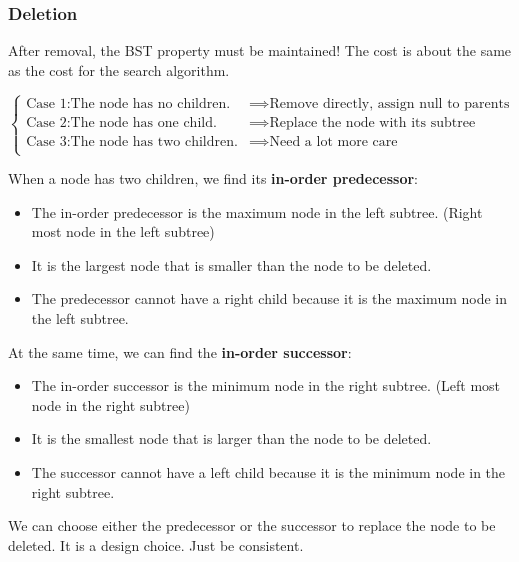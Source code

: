 \documentclass[letterpaper,12pt]{article}
\begin{document}
\subsubsection{Deletion}
After removal, the BST property must be maintained! The cost is about the same as the cost for the search algorithm.

$\begin{cases}
    \text{Case 1:}  \text{The node has no children.} &\implies \text{Remove directly, assign null to parents} \\
    \text{Case 2:}  \text{The node has one child.} &\implies \text{Replace the node with its subtree}\\
    \text{Case 3:}  \text{The node has two children.} &\implies \text{Need a lot more care}\\
\end{cases}$

When a node has two children, we find its \textbf{in-order predecessor}:\begin{itemize}
    \item The in-order predecessor is the maximum node in the left subtree. (Right most node in the left subtree)
    \item It is the largest node that is smaller than the node to be deleted.
    \item The predecessor cannot have a right child because it is the maximum node in the left subtree.
\end{itemize}
At the same time, we can find the \textbf{in-order successor}:\begin{itemize}
    \item The in-order successor is the minimum node in the right subtree. (Left most node in the right subtree)
    \item It is the smallest node that is larger than the node to be deleted.
    \item The successor cannot have a left child because it is the minimum node in the right subtree.
\end{itemize}

We can choose either the predecessor or the successor to replace the node to be deleted. It is a design choice. Just be consistent. 
\end{document}
